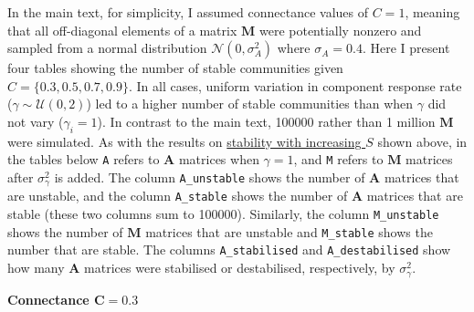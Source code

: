\documentclass[]{article}
\begin{document}
In the main text, for simplicity, I assumed connectance values of
\(C = 1\), meaning that all off-diagonal elements of a matrix
\(\mathbf{M}\) were potentially nonzero and sampled from a normal
distribution \(\mathcal{N}(0, \sigma^{2}_{A})\) where
\(\sigma_{A} = 0.4\). Here I present four tables showing the number of
stable communities given \(C = \{0.3, 0. 5, 0.7, 0.9 \}\). In all cases,
uniform variation in component response rate
(\(\gamma \sim \mathcal{U}(0, 2)\)) led to a higher number of stable
communities than when \(\gamma\) did not vary (\(\gamma_{i} = 1\)). In
contrast to the main text, 100000 rather than 1 million \(\mathbf{M}\)
were simulated. As with the results on
\protect\hyperlink{IncrS}{stability with increasing \(S\)} shown above,
in the tables below \texttt{A} refers to \(\mathbf{A}\) matrices when
\(\gamma = 1\), and \texttt{M} refers to \(\mathbf{M}\) matrices after
\(\sigma^{2}_{\gamma}\) is added. The column \texttt{A\_unstable} shows
the number of \(\mathbf{A}\) matrices that are unstable, and the column
\texttt{A\_stable} shows the number of \(\mathbf{A}\) matrices that are
stable (these two columns sum to 100000). Similarly, the column
\texttt{M\_unstable} shows the number of \(\mathbf{M}\) matrices that
are unstable and \texttt{M\_stable} shows the number that are stable.
The columns \texttt{A\_stabilised} and \texttt{A\_destabilised} show how
many \(\mathbf{A}\) matrices were stabilised or destabilised,
respectively, by \(\sigma^{2}_{\gamma}\).

\textbf{Connectance \(\mathbf{C = 0.3}\)}
\end{document}
